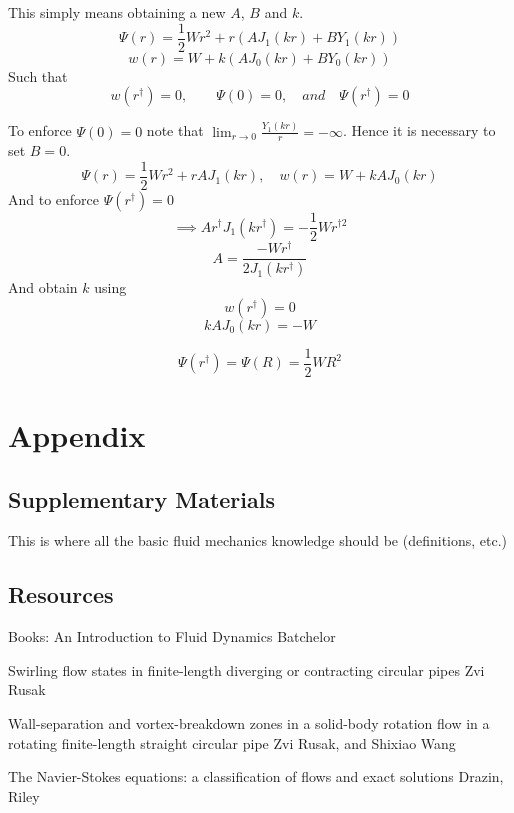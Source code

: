 \documentclass{X:/Documents/Coding/Latex/myreport}
\begin{document}
This simply means obtaining a new $A$, $B$ and $k$.
\[\Psi(r) = \frac12 W r^2 + r(A J_1(kr) + BY_1(kr))\]
\[w(r) = W + k(A J_0(kr) + B Y_0(kr))\]
Such that
\[w(r^\dagger) = 0,\qquad \Psi(0) = 0,\quad and \quad \Psi(r^\dagger) = 0  \]
 
To enforce $\Psi(0) = 0$ note that $\lim_{r\to 0} \frac{Y_1(kr)}{r} = -\infty$. Hence it is necessary to set $B = 0$. 
\[\Psi(r) = \frac12 Wr^2 + rAJ_1(kr), \quad w (r) = W + kAJ_0(kr)\]
And to enforce 
$\Psi(r^\dagger) = 0$
\[\implies Ar^\dagger J_1(kr^\dagger) = -\frac12 Wr^{\dagger2}\]
\[A = \frac{-Wr^{\dagger}}{2J_1(kr^\dagger)}\]
And obtain $k$ using
\[w(r^\dagger) = 0\]
\[k AJ_0(kr) = -W\]


\[\Psi(r^\dagger) = \Psi(R) = \frac12 WR^2\]











\clearpage
\section{Appendix}
\subsection{Supplementary Materials}
This is where all the basic fluid mechanics knowledge should be (definitions, etc.)

\subsection{Resources}
Books:
An Introduction to Fluid Dynamics
Batchelor

Swirling flow states in finite-length diverging or contracting circular pipes
Zvi Rusak


Wall-separation and vortex-breakdown zones in a solid-body rotation flow in a rotating finite-length straight circular pipe
Zvi Rusak, and Shixiao Wang

The Navier-Stokes equations: a classification of flows and exact solutions
Drazin, Riley


\end{document}
